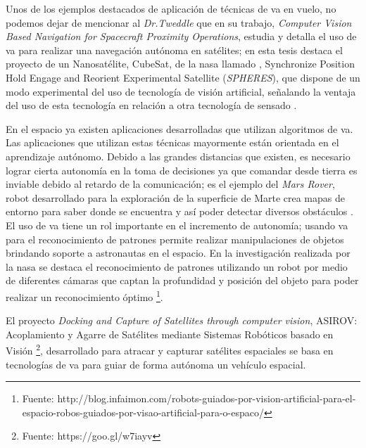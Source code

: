 Unos de los ejemplos destacados de aplicación de técnicas de \ac{va} en vuelo, no podemos dejar de mencionar al \textit{Dr.Tweddle} que en su trabajo, \textit{Computer Vision Based Navigation for Spacecraft Proximity Operations}, estudia y detalla el uso de \ac{va} para realizar una navegación autónoma en satélites; en esta tesis destaca el proyecto de un Nanosatélite, CubeSat, de la \ac{nasa} llamado , Synchronize Position Hold Engage and Reorient Experimental Satellite (\textit{SPHERES}), que dispone de un modo experimental del uso de tecnología de visión artificial, señalando la ventaja del uso de esta tecnología en relación a otra tecnología de sensado \citep{Brent}.

En el espacio ya existen aplicaciones desarrolladas que utilizan algoritmos de \ac{va}. Las aplicaciones que utilizan estas técnicas mayormente están orientada en el aprendizaje autónomo. Debido a las grandes distancias que existen, es necesario lograr cierta autonomía en la toma de decisiones ya que comandar desde tierra es inviable debido al retardo de la comunicación; es el ejemplo del \textit{Mars Rover}, robot desarrollado para la exploración de la superficie de Marte crea mapas de entorno para saber donde se encuentra y así poder detectar diversos obstáculos \citep{RoverMars}. 
El uso de \ac{va} tiene un rol importante en el incremento de autonomía; usando \ac{va} para el reconocimiento de patrones permite realizar manipulaciones de objetos brindando soporte a astronautas en el espacio. En la investigación realizada por la \ac{nasa} se destaca el reconocimiento de patrones utilizando un robot por medio de diferentes cámaras que captan la profundidad y posición del objeto para poder realizar un reconocimiento óptimo \footnote{Fuente: 
http://blog.infaimon.com/robots-guiados-por-vision-artificial-para-el-espacio-robos-guiados-por-visao-artificial-para-o-espaco/}.

El proyecto \textit{Docking and Capture of Satellites through computer vision}, ASIROV: Acoplamiento y Agarre de Satélites mediante Sistemas Robóticos basado en Visión \footnote{Fuente: https://goo.gl/w7iayv}, desarrollado para atracar y capturar satélites espaciales se basa  en tecnologías de \ac{va} para guiar de forma autónoma un vehículo espacial.

